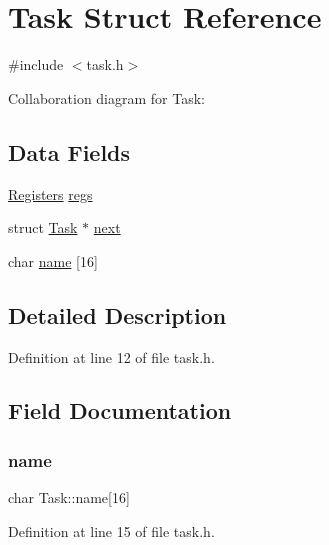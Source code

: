 \hypertarget{a00134}{}\section{Task Struct Reference}
\label{a00134}


{\ttfamily \#include $<$task.\+h$>$}



Collaboration diagram for Task\+:
\subsection*{Data Fields}
\begin{DoxyCompactItemize}
\item 
\hyperlink{a00130}{Registers} \hyperlink{a00134_a136b243ee52ff89e9ba97f4e4dba19bb_a136b243ee52ff89e9ba97f4e4dba19bb}{regs}
\item 
struct \hyperlink{a00134}{Task} $\ast$ \hyperlink{a00134_a8b6b50960a19f7bae344ef0cc8ec4e7d_a8b6b50960a19f7bae344ef0cc8ec4e7d}{next}
\item 
char \hyperlink{a00134_a7718ab6bb7a99b2b818b5b5cf9176456_a7718ab6bb7a99b2b818b5b5cf9176456}{name} \mbox{[}16\mbox{]}
\end{DoxyCompactItemize}


\subsection{Detailed Description}


Definition at line 12 of file task.\+h.



\subsection{Field Documentation}
\mbox{\label{a00134_a7718ab6bb7a99b2b818b5b5cf9176456_a7718ab6bb7a99b2b818b5b5cf9176456}} 
\subsubsection{\texorpdfstring{name}{name}}
{\footnotesize\ttfamily char Task\+::name\mbox{[}16\mbox{]}}



Definition at line 15 of file task.\+h.

\mbox{\label{a00134_a8b6b50960a19f7bae344ef0cc8ec4e7d_a8b6b50960a19f7bae344ef0cc8ec4e7d}} 
